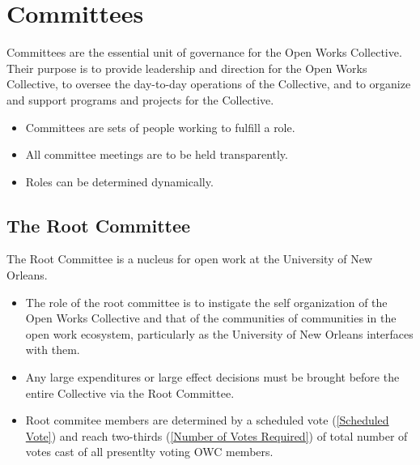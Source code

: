\documentclass{article}
\newcommand{\article}[1]{\section{#1} \label{#1}}
\newcommand{\asection}[1]{\subsection{#1} \label{#1}}
\newcommand{\asubsection}[1]{\subsubsection{#1} \label{#1}}
\begin{document}

%
%
\article{Committees}
Committees are the essential unit of governance for the Open Works Collective.
Their purpose is to provide leadership and direction for the Open Works Collective, to oversee the day-to-day operations of the Collective, and to organize and support programs and projects for the Collective.

\begin{itemize}
    \item Committees are sets of people working to fulfill a role.
    \item All committee meetings are to be held transparently.
    \item Roles can be determined dynamically.
\end{itemize}



\asection{The Root Committee}
The Root Committee is a nucleus for open work at the University of New Orleans.
\begin{itemize}
	\item The role of the root committee is to instigate the self organization of the Open Works Collective and that of the communities of communities in the open work ecosystem, particularly as the University of New Orleans interfaces with them.
	\item Any large expenditures or large effect decisions must be brought before the entire Collective via the Root Committee.
	\item Root commitee members are determined by a scheduled vote (\ref{Scheduled Vote}) and reach two-thirds (\ref{Number of Votes Required}) of total number of votes cast of all presentlty voting OWC members.
\end{itemize}
\end{document}
